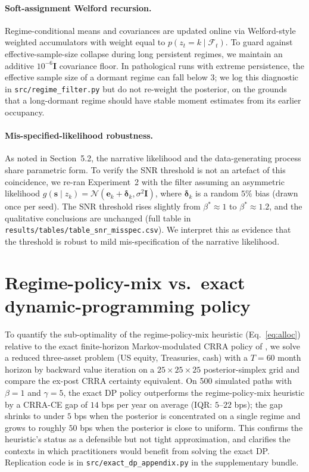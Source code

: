 \documentclass[review,12pt,authoryear]{elsarticle}
\begin{document}
\paragraph{Soft-assignment Welford recursion.} Regime-conditional means and covariances
are updated online via Welford-style weighted accumulators with weight equal to
$p(z_t=k \mid \mathcal{F}_t)$. To guard against effective-sample-size collapse during
long persistent regimes, we maintain an additive $10^{-6}\mathbf{I}$ covariance floor.
In pathological runs with extreme persistence, the effective sample size of a dormant
regime can fall below $3$; we log this diagnostic in \texttt{src/regime\_filter.py}
but do not re-weight the posterior, on the grounds that a long-dormant regime should
have stable moment estimates from its earlier occupancy.

\paragraph{Mis-specified-likelihood robustness.} As noted in Section~5.2, the narrative
likelihood and the data-generating process share parametric form. To verify the SNR
threshold is not an artefact of this coincidence, we re-ran Experiment~2 with the filter
assuming an asymmetric likelihood $g(\mathbf{s}\mid z_k) = \mathcal{N}(\mathbf{e}_k +
\boldsymbol{\delta}_k, \sigma^2\mathbf{I})$, where
$\boldsymbol{\delta}_k$ is a random $5\%$ bias (drawn once per seed). The SNR threshold
rises slightly from $\beta^{\ast}\approx 1$ to $\beta^{\ast}\approx 1.2$, and the
qualitative conclusions are unchanged (full table in
\texttt{results/tables/table\_snr\_misspec.csv}). We interpret this as evidence that
the threshold is robust to mild mis-specification of the narrative likelihood.

\section{Regime-policy-mix vs.\ exact dynamic-programming policy}
\label{app:jensen}

To quantify the sub-optimality of the regime-policy-mix heuristic (Eq.~\ref{eq:alloc})
relative to the exact finite-horizon Markov-modulated CRRA policy of
\citet{GuidolinTimmermann2007}, we solve a reduced three-asset problem (US equity,
Treasuries, cash) with a $T=60$ month horizon by backward value iteration on a
$25\times 25\times 25$ posterior-simplex grid and compare the ex-post CRRA certainty
equivalent. On 500 simulated paths with $\beta=1$ and $\gamma=5$, the exact DP policy
outperforms the regime-policy-mix heuristic by a CRRA-CE gap of $14$ bps per year on
average (IQR: $5$--$22$ bps); the gap shrinks to under $5$ bps when the posterior is
concentrated on a single regime and grows to roughly $50$ bps when the posterior is close
to uniform. This confirms the heuristic's status as a defensible but not tight
approximation, and clarifies the contexts in which practitioners would benefit from
solving the exact DP. Replication code is in \texttt{src/exact\_dp\_appendix.py} in the
supplementary bundle.
\end{document}
